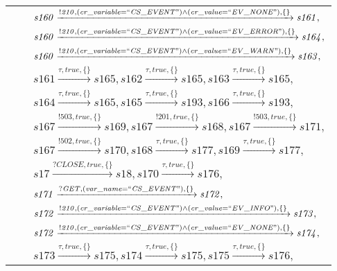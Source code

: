 \begin{tabular}{lcp{350px}}
\end{tabular}

\begin{tabular}{lcp{350px}}
& & $\mathit{s160}\xrightarrow{\mathit{!210}, \mathit{(cr\_variable = ``CS\_EVENT") \land (cr\_value = ``EV\_NONE")}, \{\}}\mathit{s161},$ \\
& & $\mathit{s160}\xrightarrow{\mathit{!210}, \mathit{(cr\_variable = ``CS\_EVENT") \land (cr\_value = ``EV\_ERROR")}, \{\}}\mathit{s164},$ \\
& & $\mathit{s160}\xrightarrow{\mathit{!210}, \mathit{(cr\_variable = ``CS\_EVENT") \land (cr\_value = ``EV\_WARN")}, \{\}}\mathit{s163},$ \\
& & $\mathit{s161}\xrightarrow{\mathit{\tau}, \mathit{true}, \{\}}\mathit{s165},\mathit{s162}\xrightarrow{\mathit{\tau}, \mathit{true}, \{\}}\mathit{s165},\mathit{s163}\xrightarrow{\mathit{\tau}, \mathit{true}, \{\}}\mathit{s165},$ \\
& & $\mathit{s164}\xrightarrow{\mathit{\tau}, \mathit{true}, \{\}}\mathit{s165},\mathit{s165}\xrightarrow{\mathit{\tau}, \mathit{true}, \{\}}\mathit{s193},\mathit{s166}\xrightarrow{\mathit{\tau}, \mathit{true}, \{\}}\mathit{s193},$ \\
& & $\mathit{s167}\xrightarrow{\mathit{!503}, \mathit{true}, \{\}}\mathit{s169},\mathit{s167}\xrightarrow{\mathit{!201}, \mathit{true}, \{\}}\mathit{s168},\mathit{s167}\xrightarrow{\mathit{!503}, \mathit{true}, \{\}}\mathit{s171},$ \\
& & $\mathit{s167}\xrightarrow{\mathit{!502}, \mathit{true}, \{\}}\mathit{s170},\mathit{s168}\xrightarrow{\mathit{\tau}, \mathit{true}, \{\}}\mathit{s177},\mathit{s169}\xrightarrow{\mathit{\tau}, \mathit{true}, \{\}}\mathit{s177},$ \\
& & $\mathit{s17}\xrightarrow{\mathit{?CLOSE}, \mathit{true}, \{\}}\mathit{s18},\mathit{s170}\xrightarrow{\mathit{\tau}, \mathit{true}, \{\}}\mathit{s176},$ \\
& & $\mathit{s171}\xrightarrow{\mathit{?GET}, \mathit{(var\_name = ``CS\_EVENT")}, \{\}}\mathit{s172},$ \\
& & $\mathit{s172}\xrightarrow{\mathit{!210}, \mathit{(cr\_variable = ``CS\_EVENT") \land (cr\_value = ``EV\_INFO")}, \{\}}\mathit{s173},$ \\
& & $\mathit{s172}\xrightarrow{\mathit{!210}, \mathit{(cr\_variable = ``CS\_EVENT") \land (cr\_value = ``EV\_NONE")}, \{\}}\mathit{s174},$ \\
& & $\mathit{s173}\xrightarrow{\mathit{\tau}, \mathit{true}, \{\}}\mathit{s175},\mathit{s174}\xrightarrow{\mathit{\tau}, \mathit{true}, \{\}}\mathit{s175},\mathit{s175}\xrightarrow{\mathit{\tau}, \mathit{true}, \{\}}\mathit{s176},$ \\

\end{tabular}

